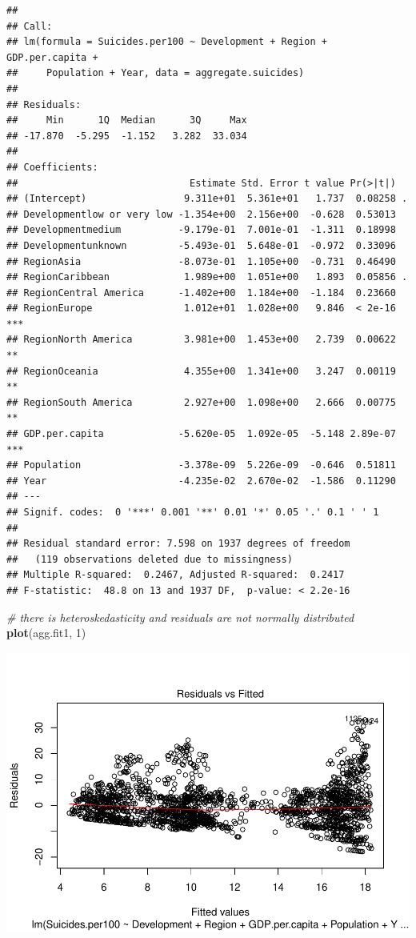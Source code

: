 \documentclass[11pt,]{article}
\newenvironment{Shaded}{\begin{snugshade}}{\end{snugshade}}
\newcommand{\CommentTok}[1]{\textcolor[rgb]{0.56,0.35,0.01}{\textit{#1}}}
\newcommand{\DecValTok}[1]{\textcolor[rgb]{0.00,0.00,0.81}{#1}}
\newcommand{\KeywordTok}[1]{\textcolor[rgb]{0.13,0.29,0.53}{\textbf{#1}}}
\newcommand{\NormalTok}[1]{#1}
\begin{document}
\begin{verbatim}
## 
## Call:
## lm(formula = Suicides.per100 ~ Development + Region + GDP.per.capita + 
##     Population + Year, data = aggregate.suicides)
## 
## Residuals:
##     Min      1Q  Median      3Q     Max 
## -17.870  -5.295  -1.152   3.282  33.034 
## 
## Coefficients:
##                              Estimate Std. Error t value Pr(>|t|)    
## (Intercept)                 9.311e+01  5.361e+01   1.737  0.08258 .  
## Developmentlow or very low -1.354e+00  2.156e+00  -0.628  0.53013    
## Developmentmedium          -9.179e-01  7.001e-01  -1.311  0.18998    
## Developmentunknown         -5.493e-01  5.648e-01  -0.972  0.33096    
## RegionAsia                 -8.073e-01  1.105e+00  -0.731  0.46490    
## RegionCaribbean             1.989e+00  1.051e+00   1.893  0.05856 .  
## RegionCentral America      -1.402e+00  1.184e+00  -1.184  0.23660    
## RegionEurope                1.012e+01  1.028e+00   9.846  < 2e-16 ***
## RegionNorth America         3.981e+00  1.453e+00   2.739  0.00622 ** 
## RegionOceania               4.355e+00  1.341e+00   3.247  0.00119 ** 
## RegionSouth America         2.927e+00  1.098e+00   2.666  0.00775 ** 
## GDP.per.capita             -5.620e-05  1.092e-05  -5.148 2.89e-07 ***
## Population                 -3.378e-09  5.226e-09  -0.646  0.51811    
## Year                       -4.235e-02  2.670e-02  -1.586  0.11290    
## ---
## Signif. codes:  0 '***' 0.001 '**' 0.01 '*' 0.05 '.' 0.1 ' ' 1
## 
## Residual standard error: 7.598 on 1937 degrees of freedom
##   (119 observations deleted due to missingness)
## Multiple R-squared:  0.2467, Adjusted R-squared:  0.2417 
## F-statistic:  48.8 on 13 and 1937 DF,  p-value: < 2.2e-16
\end{verbatim}

\begin{Shaded}
\begin{Highlighting}[]
\CommentTok{# there is heteroskedasticity and residuals are not normally distributed}
\KeywordTok{plot}\NormalTok{(agg.fit1, }\DecValTok{1}\NormalTok{)}
\end{Highlighting}
\end{Shaded}

\includegraphics{An-Analysis-of-Suicide-Data_files/figure-latex/unnamed-chunk-5-1.pdf}
\end{document}
